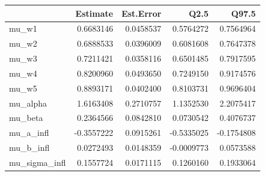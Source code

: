 
\begin{tabular}{lrrrr}
\toprule
  & Estimate & Est.Error & Q2.5 & Q97.5\\
\midrule
mu\_w1 & 0.6683146 & 0.0458537 & 0.5764272 & 0.7564964\\
mu\_w2 & 0.6888533 & 0.0396009 & 0.6081608 & 0.7647378\\
mu\_w3 & 0.7211421 & 0.0358116 & 0.6501485 & 0.7917595\\
mu\_w4 & 0.8200960 & 0.0493650 & 0.7249150 & 0.9174576\\
mu\_w5 & 0.8893171 & 0.0402400 & 0.8103731 & 0.9696404\\
\addlinespace
mu\_alpha & 1.6163408 & 0.2710757 & 1.1352530 & 2.2075417\\
mu\_beta & 0.2364566 & 0.0842810 & 0.0730542 & 0.4076737\\
mu\_a\_infl & -0.3557222 & 0.0915261 & -0.5335025 & -0.1754808\\
mu\_b\_infl & 0.0272493 & 0.0148359 & -0.0009773 & 0.0573588\\
mu\_sigma\_infl & 0.1557724 & 0.0171115 & 0.1260160 & 0.1933064\\
\bottomrule
\end{tabular}
